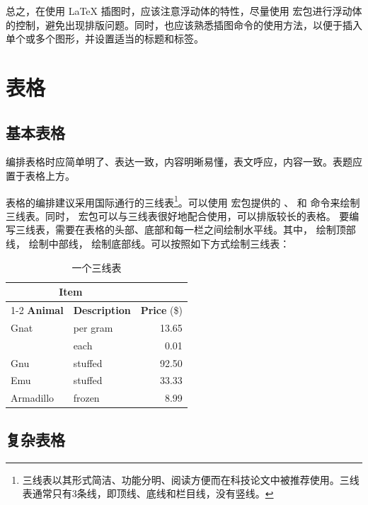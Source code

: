 总之，在使用 \LaTeX{} 插图时，应该注意浮动体的特性，尽量使用  宏包进行浮动体的控制，避免出现排版问题。同时，也应该熟悉插图命令的使用方法，以便于插入单个或多个图形，并设置适当的标题和标签。


\section{表格}

\subsection{基本表格}

编排表格时应简单明了、表达一致，内容明晰易懂，表文呼应，内容一致。表题应置于表格上方。

表格的编排建议采用国际通行的三线表\footnote{三线表以其形式简洁、功能分明、阅读方便而在科技论文中被推荐使用。三线表通常只有3条线，即顶线、底线和栏目线，没有竖线。}。可以使用  宏包提供的 、 和  命令来绘制三线表。同时， 宏包可以与三线表很好地配合使用，可以排版较长的表格。
要编写三线表，需要在表格的头部、底部和每一栏之间绘制水平线。其中， 绘制顶部线， 绘制中部线， 绘制底部线。可以按照如下方式绘制三线表：

\begin{table}[!hpt]
  \caption{一个三线表}
  \label{tab:firstone}
  \centering
  \begin{tabular}{@{}llr@{}} \toprule
    \multicolumn{2}{c}{\textbf{Item}}                            \\ \cmidrule(r){1-2}
    \textbf{Animal} & \textbf{Description} & \textbf{Price} (\$) \\ \midrule
    Gnat            & per gram             & 13.65               \\
                    & each                 & 0.01                \\
    Gnu             & stuffed              & 92.50               \\
    Emu             & stuffed              & 33.33               \\
    Armadillo       & frozen               & 8.99                \\ \bottomrule
  \end{tabular}
\end{table}

\subsection{复杂表格}

